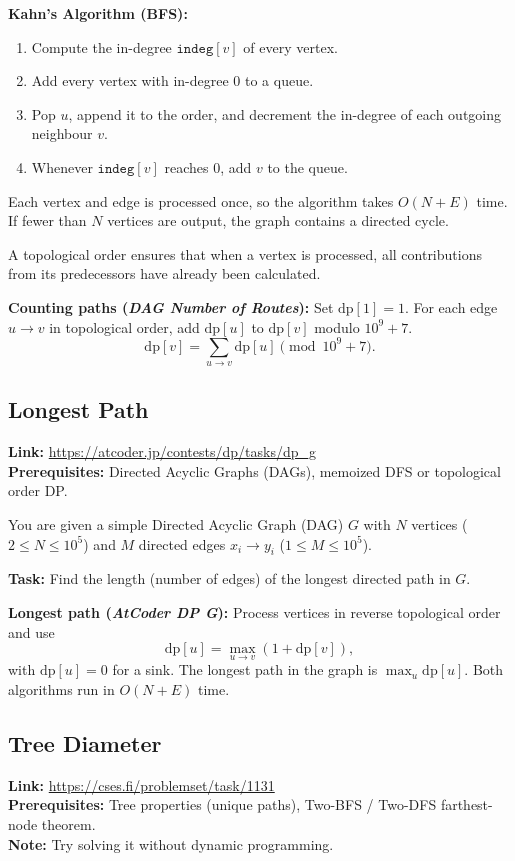 \documentclass[12pt]{article}
\begin{document}
\textbf{Kahn's Algorithm (BFS):}
\begin{enumerate}
    \item Compute the in-degree $\texttt{indeg}[v]$ of every vertex.
    \item Add every vertex with in-degree $0$ to a queue.
    \item Pop $u$, append it to the order, and decrement the in-degree of each outgoing neighbour $v$.
    \item Whenever $\texttt{indeg}[v]$ reaches $0$, add $v$ to the queue.
\end{enumerate}
Each vertex and edge is processed once, so the algorithm takes $O(N+E)$ time. If fewer than $N$ vertices are output, the graph contains a directed cycle.

A topological order ensures that when a vertex is processed, all contributions from its predecessors have already been calculated.

\textbf{Counting paths (\emph{DAG Number of Routes}):} Set $\text{dp}[1]=1$. For each edge $u \to v$ in topological order, add $\text{dp}[u]$ to $\text{dp}[v]$ modulo $10^9+7$.
\[\text{dp}[v] = \sum_{u \to v} \text{dp}[u] \pmod{10^9+7}.\]

\subsection{Longest Path}
\textbf{Link:} \url{https://atcoder.jp/contests/dp/tasks/dp_g} \\
\textbf{Prerequisites:} Directed Acyclic Graphs (DAGs), memoized DFS or topological order DP.

You are given a simple Directed Acyclic Graph (DAG) $G$ with $N$ vertices ($2 \le N \le 10^5$) and $M$ directed edges $x_i \to y_i$ ($1 \le M \le 10^5$).

\textbf{Task:} Find the length (number of edges) of the longest directed path in $G$.

\textbf{Longest path (\emph{AtCoder DP G}):} Process vertices in reverse topological order and use
\[\text{dp}[u] = \max_{u \to v}(1 + \text{dp}[v]),\]
with $\text{dp}[u]=0$ for a sink. The longest path in the graph is $\max_u \text{dp}[u]$. Both algorithms run in $O(N+E)$ time.

\subsection{Tree Diameter}
\textbf{Link:} \url{https://cses.fi/problemset/task/1131} \\
\textbf{Prerequisites:} Tree properties (unique paths), Two-BFS / Two-DFS farthest-node theorem. \\
\textbf{Note:} Try solving it without dynamic programming.
\end{document}
